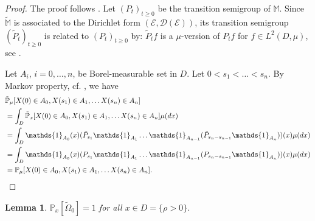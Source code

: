 \documentclass[11pt]{article}
\numberwithin{equation}{section}
\newtheorem{lemma}[theorem]{Lemma}
\theoremstyle{definition}
\begin{document}
\begin{proof}
The proof follows \cite[Lemma 4.2]{albeverio2003strong}. Let $(P_{t})_{t\ge0}$ be the transition semigroup of $\mathbb{M}$. Since $\tilde{\mathbb{M}}$ is associated to the Dirichlet form $(\mathcal{E}, \mathcal{D}(\mathcal{E}))$, its transition semigroup $(\tilde P_{t})_{t\ge 0}$ is related to $(P_{t})_{t\ge0}$ by: $\tilde P_{t}f$ is a $\mu$-version of $P_{t}f$ for $f\in L^{2}(D,\mu)$, see \cite[Remark 2.5 (ii)]{ma1992introduction}.

Let $A_{i}$, $i=0,\dots,n$, be Borel-measurable set in $D$. Let $0<s_{1}<\dots <s_{n}$.
By Markov property, cf. \cite[Lemma 4.1.2]{fukushima2011dirichlet}, we have
\begin{align*}
    &\tilde{\mathbb{P}}_{\mu}[X(0)\in A_{0},X(s_{1})\in A_{1}, \dots X(s_{n})\in A_{n}]\\
    &= \int_{D}\tilde{\mathbb{P}}_{x}[X(0)\in A_{0},X(s_{1})\in A_{1}, \dots X(s_{n})\in A_{n}]\mu(dx)\\
    &=\int_{D}\mathds{1}_{A_{0}}(x) (\tilde P_{s_{1}}\mathds{1}_{A_{1}}\dots \mathds{1}_{A_{n-1}}( \tilde P_{s_{n}-s_{n-1}}\mathds{1}_{A_{n}}))(x)\mu(dx)\\
    &=\int_{D}\mathds{1}_{A_{0}}(x) ( P_{s_{1}}\mathds{1}_{A_{1}}\dots \mathds{1}_{A_{n-1}}(  P_{s_{n}-s_{n-1}}\mathds{1}_{A_{n}}))(x)\mu(dx)\\
    &={\mathbb{P}}_{\mu}[X(0)\in A_{0},X(s_{1})\in A_{1}, \dots X(s_{n})\in A_{n}].\qedhere
\end{align*}
\end{proof}
\begin{lemma}
    $\mathbb{P}_{x}[\tilde\Omega_{0}]=1$ for all $x\in D = \{\rho>0\}$.
\end{lemma}
\end{document}
